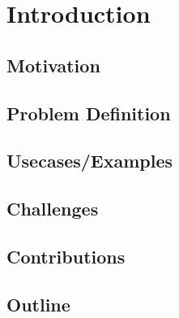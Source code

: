 
\chapter{Introduction} %
\label{Chapter1}


\section{Motivation}

\section{Problem Definition}

\section{Usecases/Examples}

\section{Challenges}

\section{Contributions}

\section{Outline}
